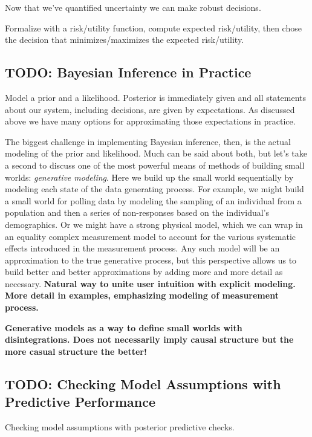 \documentclass[11pt, oneside]{article}
\begin{document}
Now that we've quantified uncertainty we can make robust decisions.

Formalize with a risk/utility function, compute expected risk/utility, then
chose the decision that minimizes/maximizes the expected risk/utility.

\subsection{TODO: Bayesian Inference in Practice}

Model a prior and a likelihood.  Posterior is immediately given and
all statements about our system, including decisions, are given by
expectations.  As discussed above we have many options for
approximating those expectations in practice.

The biggest challenge in implementing Bayesian inference, then,
is the actual modeling of the prior and likelihood.  Much can be
said about both, but let's take a second to discuss one of the most
powerful means of methods of building small worlds: \emph{generative modeling}.  
Here we build up the small world
sequentially by modeling each state of the data generating process.
For example, we might build a small world for polling data by
modeling the sampling of an individual from a population and
then a series of non-responses based on the individual's demographics.
Or we might have a strong physical model, which we can wrap
in an equality complex measurement model to account for the
various systematic effects introduced in the measurement process.
Any such model will be an approximation to the true generative
process, but this perspective allows us to build better and better
approximations by adding more and more detail as necessary.
\textbf{Natural way to unite user intuition with explicit modeling.}
\textbf{More detail in examples, emphasizing modeling of
measurement process.}

\textbf{Generative models as a way to define small worlds with
disintegrations.  Does not necessarily imply causal structure
but the more casual structure the better!}

\subsection{TODO: Checking Model Assumptions with Predictive Performance}

Checking model assumptions with posterior predictive checks.
\end{document}
